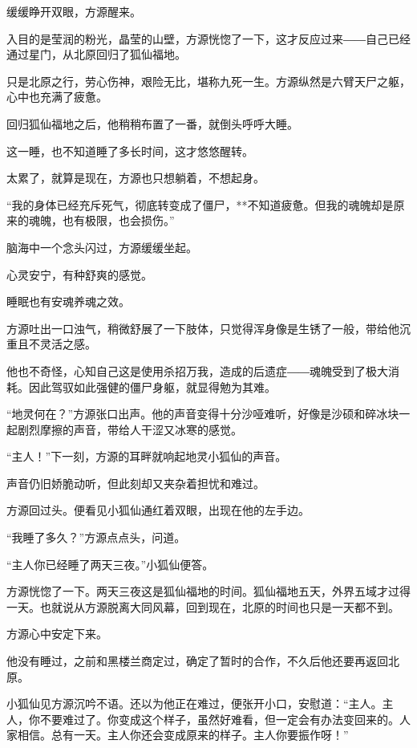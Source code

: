 
\begin{this_body}

缓缓睁开双眼，方源醒来。

入目的是莹润的粉光，晶莹的山壁，方源恍惚了一下，这才反应过来――自己已经通过星门，从北原回归了狐仙福地。

只是北原之行，劳心伤神，艰险无比，堪称九死一生。方源纵然是六臂天尸之躯，心中也充满了疲惫。

回归狐仙福地之后，他稍稍布置了一番，就倒头呼呼大睡。

这一睡，也不知道睡了多长时间，这才悠悠醒转。

太累了，就算是现在，方源也只想躺着，不想起身。

“我的身体已经充斥死气，彻底转变成了僵尸，**不知道疲惫。但我的魂魄却是原来的魂魄，也有极限，也会损伤。”

脑海中一个念头闪过，方源缓缓坐起。

心灵安宁，有种舒爽的感觉。

睡眠也有安魂养魂之效。

方源吐出一口浊气，稍微舒展了一下肢体，只觉得浑身像是生锈了一般，带给他沉重且不灵活之感。

他也不奇怪，心知自己这是使用杀招万我，造成的后遗症――魂魄受到了极大消耗。因此驾驭如此强健的僵尸身躯，就显得勉为其难。

“地灵何在？”方源张口出声。他的声音变得十分沙哑难听，好像是沙硕和碎冰块一起剧烈摩擦的声音，带给人干涩又冰寒的感觉。

“主人！”下一刻，方源的耳畔就响起地灵小狐仙的声音。

声音仍旧娇脆动听，但此刻却又夹杂着担忧和难过。

方源回过头。便看见小狐仙通红着双眼，出现在他的左手边。

“我睡了多久？”方源点点头，问道。

“主人你已经睡了两天三夜。”小狐仙便答。

方源恍惚了一下。两天三夜这是狐仙福地的时间。狐仙福地五天，外界五域才过得一天。也就说从方源脱离大同风幕，回到现在，北原的时间也只是一天都不到。

方源心中安定下来。

他没有睡过，之前和黑楼兰商定过，确定了暂时的合作，不久后他还要再返回北原。

小狐仙见方源沉吟不语。还以为他正在难过，便张开小口，安慰道：“主人。主人，你不要难过了。你变成这个样子，虽然好难看，但一定会有办法变回来的。人家相信。总有一天。主人你还会变成原来的样子。主人你要振作呀！”


\end{this_body}
